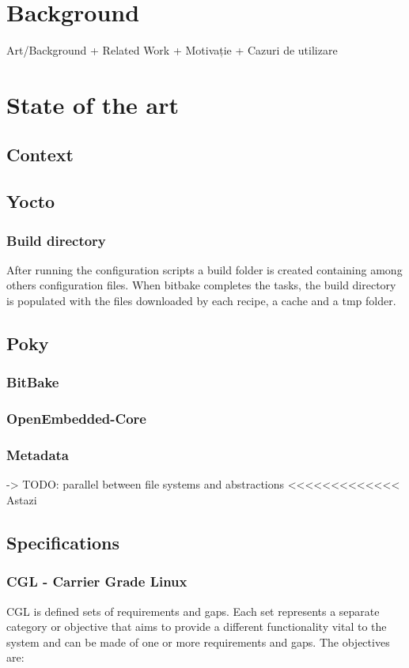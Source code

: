 \documentclass{article}
\begin{document}
	\section{Background}

	Art/Background + Related Work + Motivație + Cazuri de utilizare
	\section{State of the art}

	\subsection{Context}
	\subsection{Yocto}
        \subsubsection{Build directory}
            After running the configuration scripts a build folder is created containing among others configuration files. When bitbake completes the tasks, the build directory is populated with the files downloaded by each recipe, a cache and a tmp folder.

	\subsection{Poky}
		\subsubsection{BitBake}
		\subsubsection{OpenEmbedded-Core}
		\subsubsection{Metadata}
			-> TODO: parallel between file systems and abstractions <<<<<<<<<<<<< Astazi

	\subsection{Specifications}
		\subsubsection{CGL - Carrier Grade Linux}
			CGL is defined sets of requirements and gaps. Each set represents a separate category or objective that aims to provide a different functionality vital to the system and can be made of one or more requirements and gaps. The objectives are:
\end{document}
